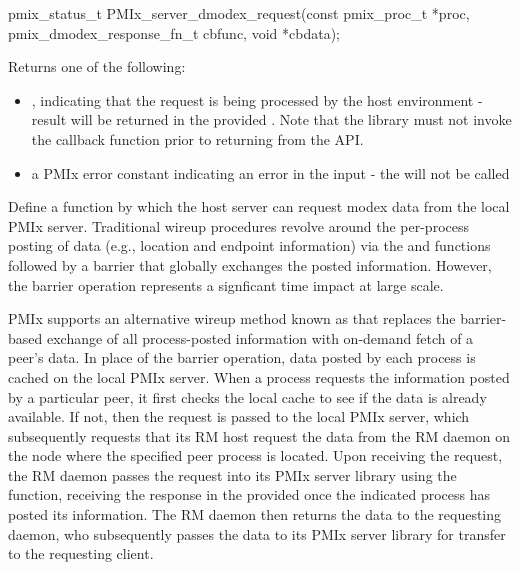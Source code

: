 \cspecificstart
\begin{codepar}
pmix_status_t
PMIx_server_dmodex_request(const pmix_proc_t *proc,
                           pmix_dmodex_response_fn_t cbfunc,
                           void *cbdata);
\end{codepar}
\cspecificend

\begin{arglist}
\end{arglist}

Returns one of the following:

\begin{itemize}
    \item {}, indicating that the request is being processed by the host environment - result will be returned in the provided . Note that the library must not invoke the callback function prior to returning from the \ac{API}.
    \item a PMIx error constant indicating an error in the input - the  will not be called
\end{itemize}


\descr

Define a function by which the host server can request modex data from the local \ac{PMIx} server. Traditional wireup procedures revolve around the per-process posting of data (e.g., location and endpoint information) via the  and  functions followed by a  barrier that globally exchanges the posted information. However, the barrier operation represents a signficant time impact at large scale.

\ac{PMIx} supports an alternative wireup method known as  that replaces the barrier-based exchange of all process-posted information with on-demand fetch of a peer's data. In place of the barrier operation, data posted by each process is cached on the local \ac{PMIx} server. When a process requests the information posted by a particular peer, it first checks the local cache to see if the data is already available. If not, then the request is passed to the local \ac{PMIx} server, which subsequently requests that its \ac{RM} host request the data from the \ac{RM} daemon on the node where the specified peer process is located. Upon receiving the request, the \ac{RM} daemon passes the request into its \ac{PMIx} server library using the  function, receiving the response in the provided  once the indicated process has posted its information. The \ac{RM} daemon then returns the data to the requesting daemon, who subsequently passes the data to its \ac{PMIx} server library for transfer to the requesting client.

